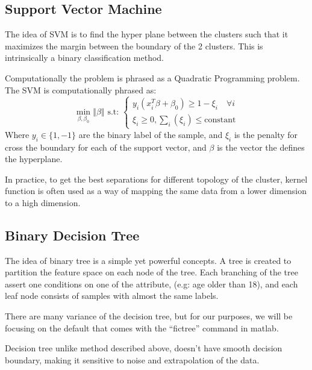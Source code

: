 \documentclass{article}
\begin{document}
    \subsection{Support Vector Machine}
        \hspace{1.1em}
        The idea of SVM is to find the hyper plane between the clusters such that it maximizes the margin between the boundary of the 2 clusters. This is intrinsically a binary classification method. 
        \par
        Computationally the problem is phrased as a Quadratic Programming problem. The SVM is computationally phrased as: 
        \begin{equation*}\tag{7}\label{eqn:7}
            \min_{\beta, \beta_0} \left\Vert
                 \beta
            \right\Vert \text{ s.t: } 
            \begin{cases}
                y_i(x_i^T\beta + \beta_0) \ge 1 - \xi_i \quad \forall i
                \\
                \xi_i \ge 0, \sum_{i}^{}\left(\xi_i\right) \le \text{constant}
            \end{cases}
        \end{equation*}
        Where $y_i\in \{1, -1\}$ are the binary label of the sample, and $\xi_i$ is the penalty for cross the boundary for each of the support vector, and $\beta$ is the vector the defines the hyperplane. 
        \par
        In practice, to get the best separations for different topology of the cluster, kernel function is often used as a way of mapping the same data from a lower dimension to a high dimension. 

    \subsection{Binary Decision Tree}
        \hspace{1.1em}
        The idea of binary tree is a simple yet powerful concepts. A tree is created to partition the feature space on each node of the tree. Each branching of the tree assert one conditions on one of the attribute, (e.g: age older than 18), and each leaf node consists of samples with almost the same labels. 
        \par
        There are many variance of the decision tree, but for our purposes, we will be focusing on the default that comes with the ``fictree'' command in matlab. 
        \par
        Decision tree unlike method described above, doesn't have smooth decision boundary, making it sensitive to noise and extrapolation of the data. 
\end{document}
